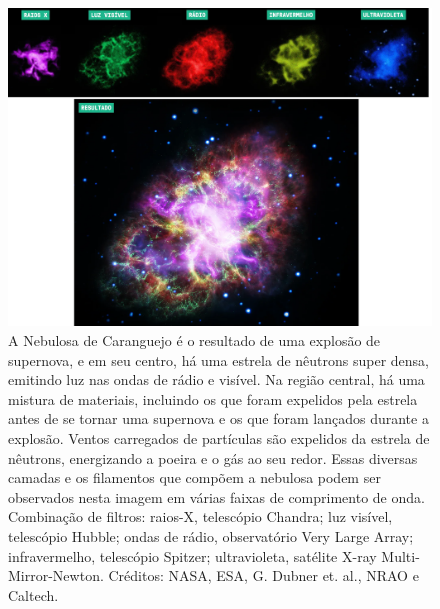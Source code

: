  \begin{figure}[h]
   \centering 
   \includegraphics[width=1.0\textwidth]{Imagens/caranguejo_02.png} 
   \caption[Combinação de filtros para imagem da Nebulosa de Caranguejo.]{A Nebulosa de Caranguejo é o resultado de uma explosão de supernova, e em seu centro, há uma estrela de nêutrons super densa, emitindo luz nas ondas de rádio e visível. Na região central, há uma mistura de materiais, incluindo os que foram expelidos pela estrela antes de se tornar uma supernova e os que foram lançados durante a explosão. Ventos carregados de partículas são expelidos da estrela de nêutrons, energizando a poeira e o gás ao seu redor. Essas diversas camadas e os filamentos que compõem a nebulosa podem ser observados nesta imagem em várias faixas de comprimento de onda. Combinação de filtros: raios-X, telescópio Chandra; luz visível, telescópio Hubble; ondas de rádio, observatório Very Large Array; infravermelho, telescópio Spitzer; ultravioleta, satélite X-ray Multi-Mirror-Newton. Créditos: NASA, ESA, G. Dubner et. al., NRAO e Caltech.}
   \label{fig:caranguejo} 
 \end{figure}
 
